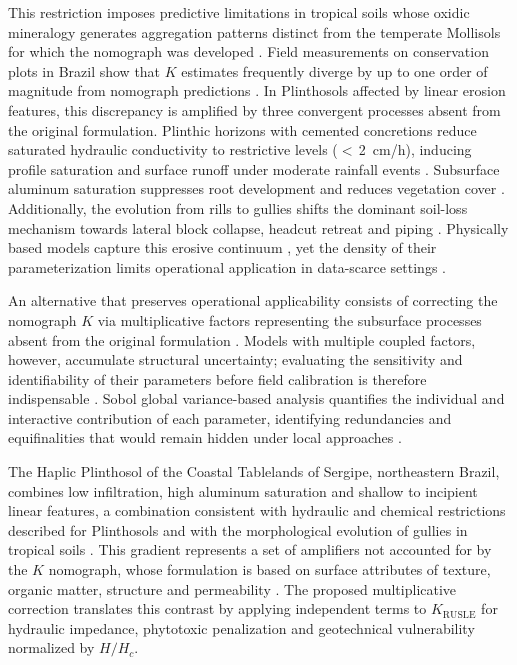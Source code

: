 \documentclass[preprint,review,12pt,authoryear]{elsarticle}
\begin{document}
This restriction imposes predictive limitations in tropical soils whose oxidic mineralogy generates aggregation patterns distinct from the temperate Mollisols for which the nomograph was developed \citep{alewell_et_al_2019,cassol_et_al_2023}. Field measurements on conservation plots in Brazil show that $K$ estimates frequently diverge by up to one order of magnitude from nomograph predictions \citep{silva_et_al_2009,lafayette_cantalice_coutinho_2011}. In Plinthosols affected by linear erosion features, this discrepancy is amplified by three convergent processes absent from the original formulation. Plinthic horizons with cemented concretions reduce saturated hydraulic conductivity to restrictive levels ($<$\,2~cm/h), inducing profile saturation and surface runoff under moderate rainfall events \citep{wang_et_al_2020,embrapa_2018,horton_1933,bertoni_lombardi_neto_2017}. Subsurface aluminum saturation suppresses root development and reduces vegetation cover \citep{gura_et_al_2022}. Additionally, the evolution from rills to gullies shifts the dominant soil-loss mechanism towards lateral block collapse, headcut retreat and piping \citep{poesen_2018,poesen_et_al_2003,kirkby_bracken_2009,vanmaercke_et_al_2021}. Physically based models capture this erosive continuum \citep{nearing_et_al_1989,sidorchuk_2006}, yet the density of their parameterization limits operational application in data-scarce settings \citep{wilkinson_et_al_2024}.

An alternative that preserves operational applicability consists of correcting the nomograph $K$ via multiplicative factors representing the subsurface processes absent from the original formulation \citep{alewell_et_al_2019}. Models with multiple coupled factors, however, accumulate structural uncertainty; evaluating the sensitivity and identifiability of their parameters before field calibration is therefore indispensable \citep{saltelli_et_al_2004}. Sobol global variance-based analysis quantifies the individual and interactive contribution of each parameter, identifying redundancies and equifinalities that would remain hidden under local approaches \citep{sobol_2001,francois_et_al_2024}.

The Haplic Plinthosol of the Coastal Tablelands of Sergipe, northeastern Brazil, combines low infiltration, high aluminum saturation and shallow to incipient linear features, a combination consistent with hydraulic and chemical restrictions described for Plinthosols and with the morphological evolution of gullies in tropical soils \citep{nascimento_pedrotti_2004,embrapa_2018,gura_et_al_2022,poesen_2018}. This gradient represents a set of amplifiers not accounted for by the $K$ nomograph, whose formulation is based on surface attributes of texture, organic matter, structure and permeability \citep{wischmeier_et_al_1971,roemkens_et_al_1997,alewell_et_al_2019}. The proposed multiplicative correction translates this contrast by applying independent terms to $K_{\mathrm{RUSLE}}$ for hydraulic impedance, phytotoxic penalization and geotechnical vulnerability normalized by $H/H_c$.
\end{document}
